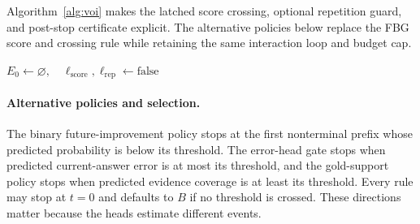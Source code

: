 Algorithm~\ref{alg:voi} makes the latched score crossing, optional repetition
guard, and post-stop certificate explicit. The alternative policies below
replace the FBG score and crossing rule while retaining the same interaction
loop and budget cap.

\begin{algorithm}[t]
\DontPrintSemicolon
{}
\caption{FBG-only and repeat-guarded retrieval control with an optional
post-stop certificate.}
\label{alg:voi}
$E_0\gets\varnothing,\quad \ell_{\mathrm{score}},\ell_{\mathrm{rep}}\gets\mathrm{false}$\;
\end{algorithm}

\paragraph{Alternative policies and selection.}
The binary future-improvement policy stops at the first nonterminal prefix
whose predicted probability is below its threshold. The error-head gate stops
when predicted current-answer error is at most its threshold, and the
gold-support policy stops when predicted evidence coverage is at least its
threshold. Every rule may stop at $t=0$ and defaults to $B$ if no threshold is
crossed. These directions matter because the heads estimate different events.

